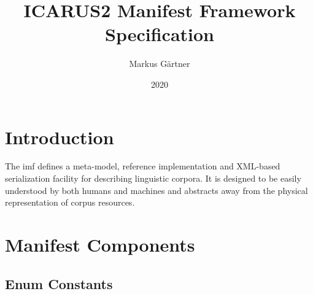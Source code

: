 \documentclass[11pt,a4paper]{report}
\title{ICARUS2 Manifest Framework Specification}
\author{Markus Gärtner}
\date{2020}
\begin{document}
\maketitle

\tableofcontents

\listoffigures

\listoftables

\listoftodos

\newpage

\chapter*{Introduction}
\label{chap:intro}

The \ac{imf} defines a meta-model, reference implementation and XML-based serialization facility for describing linguistic corpora.
It is designed to be easily understood by both humans and machines and abstracts away from the physical representation of corpus resources.

\chapter{Manifest Components}
\label{chap:components}


\section{Enum Constants}
\label{sec:enums}
\end{document}
